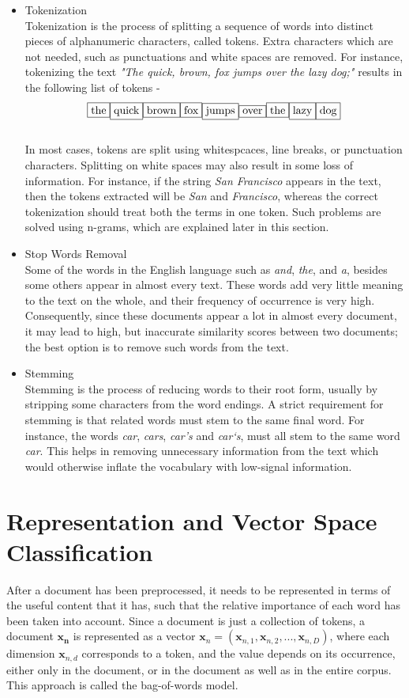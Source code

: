 \begin{itemize}
    \item{
    Tokenization\\
    Tokenization is the process of splitting a sequence of words into distinct pieces of alphanumeric characters, called tokens. Extra characters which are not needed, such as punctuations and white spaces are removed. For instance, tokenizing the text \emph{"The quick, brown, fox jumps over the lazy dog;"} results in the following list of tokens - \\
    $$\fbox{the} \fbox{quick} \fbox{brown} \fbox{fox} \fbox{jumps} \fbox{over} \fbox{the} \fbox{lazy} \fbox{dog}$$\\
    In most cases, tokens are split using whitespcaces, line breaks, or punctuation characters. Splitting on white spaces may also result in some loss of information. For instance, if the string \emph{San Francisco} appears in the text, then the tokens extracted will be \emph{San} and \emph{Francisco}, whereas the correct tokenization should treat both the terms in one token. Such problems are solved using n-grams, which are explained later in this section.
    }
    \item{
    Stop Words Removal\\
    Some of the words in the English language such as \emph{and}, \emph{the}, and \emph{a}, besides some others appear in almost every text. These words add very little meaning to the text on the whole, and their frequency of occurrence is very high. Consequently, since these documents appear a lot in almost every document, it may lead to high, but inaccurate similarity scores between two documents; the best option is to remove such words from the text.
    }
    \item{
    Stemming\\
    Stemming is the process of reducing words to their root form, usually by stripping some characters from the word endings. A strict requirement for stemming is that related words must stem to the same final word. For instance, the words \emph{car}, \emph{cars}, \emph{car's} and \emph{car`s}, must all stem to the same word \emph{car}. This helps in removing unnecessary information from the text which would otherwise inflate the vocabulary with low-signal information.
    }
\end{itemize}

\section{Representation and Vector Space Classification}
After a document has been preprocessed, it needs to be represented in terms of the useful content that it has, such that the relative importance of each word has been taken into account. Since a document is just a collection of tokens, a document $\mathbf{x_{n}}$ is represented as a vector $\mathbf{x}_{n} = (\mathbf{x}_{n, 1}, \mathbf{x}_{n, 2}, ... , \mathbf{x}_{n, D})$, where each dimension $\mathbf{x}_{n, d}$ corresponds to a token, and the value depends on its occurrence, either only in the document, or in the document as well as in the entire corpus. This approach is called the bag-of-words model.

